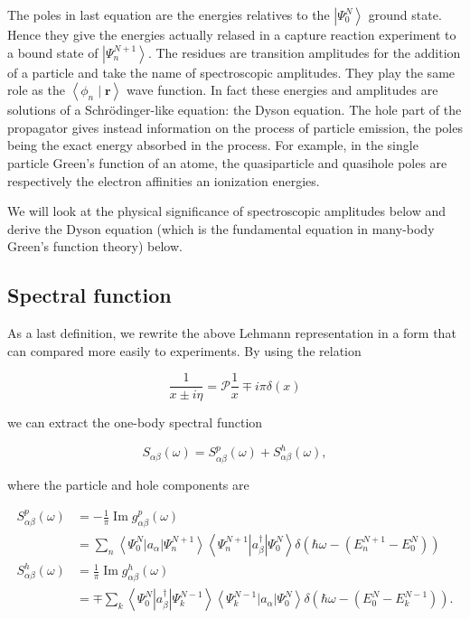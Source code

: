 {{The poles in last equation are the energies relatives to the
$\left|\Psi_{0}^{N}\right\rangle$ ground state. Hence they give the
energies actually relased in a capture reaction experiment to a bound
state of $\left|\Psi_{n}^{N+1}\right\rangle$. The residues are
transition amplitudes for the addition of a particle and take the name
of spectroscopic amplitudes. They play the same role as the
$\left\langle\phi_{n} \mid \mathbf{r}\right\rangle$ wave function.
In fact these energies and amplitudes are solutions of a
Schr\"odinger-like equation: the Dyson equation. The hole part of the
propagator gives instead information on the process of particle
emission, the poles being the exact energy absorbed in the
process. For example, in the single particle Green's function of an atome,
the quasiparticle and quasihole poles are respectively the
electron affinities an ionization energies.

We will look at the physical significance of spectroscopic amplitudes
below and derive the Dyson equation (which is the
fundamental equation in many-body Green's function theory) below.

\subsection{Spectral function}

As a last definition, we rewrite the above Lehmann representation  in a form
that can compared more easily to experiments. By using the relation

$$
\frac{1}{x \pm i \eta}=\mathcal{P} \frac{1}{x} \mp i \pi \delta(x)
$$
}
we can extract the one-body spectral function

$$
S_{\alpha \beta}(\omega)=S_{\alpha \beta}^{p}(\omega)+S_{\alpha \beta}^{h}(\omega),
$$

where the particle and hole components are

$$
\begin{aligned}
S_{\alpha \beta}^{p}(\omega) & =-\frac{1}{\pi} \operatorname{Im} g_{\alpha \beta}^{p}(\omega) \\
& =\sum_{n}\left\langle\Psi_{0}^{N}\left|a_{\alpha}\right| \Psi_{n}^{N+1}\right\rangle\left\langle\Psi_{n}^{N+1}\left|a_{\beta}^{\dagger}\right| \Psi_{0}^{N}\right\rangle \delta\left(\hbar \omega-\left(E_{n}^{N+1}-E_{0}^{N}\right)\right) \\
S_{\alpha \beta}^{h}(\omega) & =\frac{1}{\pi} \operatorname{Im} g_{\alpha \beta}^{h}(\omega) \\
& =\mp \sum_{k}\left\langle\Psi_{0}^{N}\left|a_{\beta}^{\dagger}\right| \Psi_{k}^{N-1}\right\rangle\left\langle\Psi_{k}^{N-1}\left|a_{\alpha}\right| \Psi_{0}^{N}\right\rangle \delta\left(\hbar \omega-\left(E_{0}^{N}-E_{k}^{N-1}\right)\right) .
\end{aligned}
$$


}
